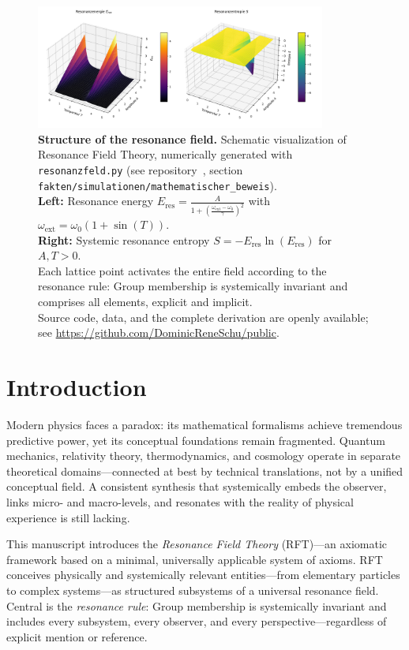 \documentclass[12pt]{iopart}
\begin{document}
\begin{figure}[ht]
	\centering
	\includegraphics[width=0.85\textwidth]{figures/plot.png}
	\caption{
		\textbf{Structure of the resonance field.}
		Schematic visualization of Resonance Field Theory, numerically generated with \texttt{resonanzfeld.py} (see repository~\cite{rftrepo}, section \texttt{fakten/simulationen/mathematischer\_beweis}).\\
		\textbf{Left:} Resonance energy $E_{\mathrm{res}} = \frac{A}{1 + \left(\frac{\omega_\mathrm{ext} - \omega_0}{\gamma}\right)^2}$ with $\omega_\mathrm{ext} = \omega_0 (1 + \sin(T))$.\\
		\textbf{Right:} Systemic resonance entropy $S = -E_{\mathrm{res}}\ln(E_{\mathrm{res}})$ for $A, T > 0$.\\
		Each lattice point activates the entire field according to the resonance rule: Group membership is systemically invariant and comprises all elements, explicit and implicit.\\
		Source code, data, and the complete derivation are openly available; see \url{https://github.com/DominicReneSchu/public}.
	}
	\label{fig:resonance_field_plot}
\end{figure}
\newpage
	\section{Introduction}
	
	Modern physics faces a paradox: its mathematical formalisms achieve tremendous predictive power, yet its conceptual foundations remain fragmented. Quantum mechanics, relativity theory, thermodynamics, and cosmology operate in separate theoretical domains—connected at best by technical translations, not by a unified conceptual field. A consistent synthesis that systemically embeds the observer, links micro- and macro-levels, and resonates with the reality of physical experience is still lacking.
	
	This manuscript introduces the \textit{Resonance Field Theory} (RFT)—an axiomatic framework based on a minimal, universally applicable system of axioms. RFT conceives physically and systemically relevant entities—from elementary particles to complex systems—as structured subsystems of a universal resonance field. Central is the \textit{resonance rule}: Group membership is systemically invariant and includes every subsystem, every observer, and every perspective—regardless of explicit mention or reference.
	
\end{document}
